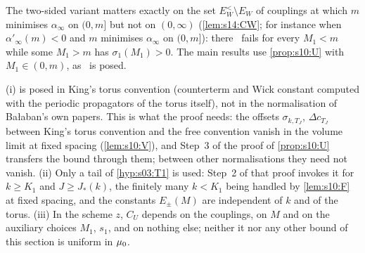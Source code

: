 The two-sided variant matters exactly on the set $E^<_W\setminus E_W$ of couplings at which $m$ minimises $\alpha_\infty$ on $(0,m]$ but not on $(0,\infty)$ (\cref{lem:s14:CW}; for instance when $\alpha'_\infty(m)<0$ and $m$ minimises $\alpha_\infty$ on $(0,m]$): there \Tthree\ fails for every $M_1<m$ while some $M_1>m$ has $\sigma_1(M_1)>0$. The main results use \cref{prop:s10:U} with $M_1\in(0,m)$, as \Tthree\ is posed.

\begin{remark}\label{rem:s10:T1convention}
(i)  is posed in King's torus convention (counterterm and Wick constant computed with the periodic propagators of the torus itself), not in the normalisation of Bałaban's own papers. This is what the proof needs: the offsets $\sigma_{k,T_J}$, $\Delta c_{T_J}$ between King's torus convention and the free convention vanish in the volume limit at fixed spacing (\cref{lem:s10:V}), and Step~3 of the proof of \cref{prop:s10:U} transfers the bound through them; between other normalisations they need not vanish. (ii) Only a tail of \cref{hyp:s03:T1} is used: Step~2 of that proof invokes it for $k\ge K_1$ and $J\ge J_*(k)$, the finitely many $k<K_1$ being handled by \cref{lem:s10:F} at fixed spacing, and the constants $E_\pm(M)$ are independent of $k$ and of the torus. (iii) In the scheme $z$, $C_U$ depends on the couplings, on $M$ and on the auxiliary choices $M_1$, $s_1$, and on nothing else; neither it nor any other bound of this section is uniform in $\mu_0$.
\end{remark}
